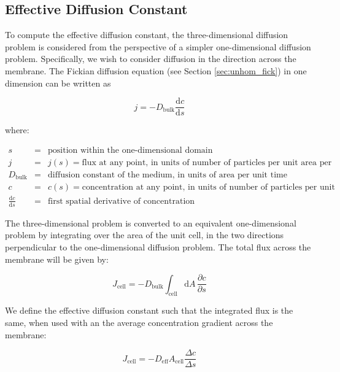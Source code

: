 \subsection{Effective Diffusion Constant}\label{subsec:D_eff}

To compute the effective diffusion constant,
the three-dimensional diffusion problem is considered from the perspective of a simpler one-dimensional diffusion problem.
Specifically, we wish to consider diffusion in the direction across the membrane.
The Fickian diffusion equation (see Section \ref{sec:unhom_fick}) in one dimension can be written as

\begin{equation}\label{eq:fickslaw_1D}
j = - D_{\mathrm{bulk}} \frac{\mathrm{d}c}{\mathrm{d}s}
\end{equation}

where:

$\begin{array}{rcl}
s & = & \text{position within the one-dimensional domain} \\
j & = & j(s) = \text{flux at any point, in units of number of particles per unit area per unit time} \\
D_{\text{bulk}} & = & \text{diffusion constant of the medium, in units of area per unit time} \\
c & = & c(s) = \text{concentration at any point, in units of number of particles per unit volume} \\
\frac{\mathrm{d}c}{\mathrm{d}s} & = & \text{first spatial derivative of concentration}
\end{array}$

The three-dimensional problem is converted to an equivalent one-dimensional problem
by integrating over the area of the unit cell, in the two directions perpendicular to
the one-dimensional diffusion problem.
The total flux across the membrane will be given by:

\begin{equation}
J_{\mathrm{cell}} = - D_{\mathrm{bulk}}\int_{\mathrm{cell}} \mathrm{d}A\, \frac{\partial c}{\partial s}
\end{equation}

We define the effective diffusion constant such that the integrated flux is the same,
when used with an the average concentration gradient across the membrane:

\begin{equation}\label{eq:Deff_Jcell}
J_{\mathrm{cell}} = - D_{\mathrm{eff}} A_{\mathrm{cell}} \frac{\Delta c}{\Delta s}
\end{equation}

